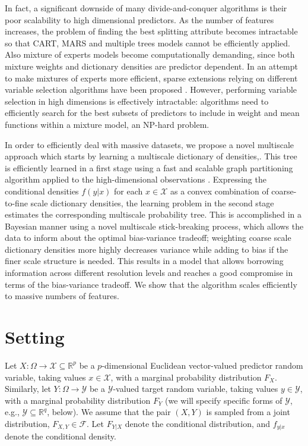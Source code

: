 \documentclass{article} %
\newcommand{\Real}{\mathbb{R}}
\providecommand{\mc}[1]{\mathcal{#1}}
\newcommand{\from}{{\ensuremath{\colon}}}  %
\begin{document}
In fact, a significant downside of many divide-and-conquer algorithms is their poor scalability to high dimensional predictors. As the number of features increases, the problem of finding the best splitting attribute becomes intractable so that CART, MARS and multiple trees models cannot be efficiently applied. Also mixture of experts models become computationally demanding, since both mixture weights and dictionary densities are predictor dependent. In an attempt to make mixtures of experts more efficient, sparse extensions relying on different variable selection algorithms have been proposed \cite{SparseMoF}. However, performing variable selection in high dimensions is effectively intractable: algorithms need to efficiently search for the best subsets of predictors to include in weight and mean functions within a mixture model, an NP-hard problem.

 In order to efficiently deal with massive datasets, we propose a novel multiscale approach which starts by learning a multiscale dictionary of densities,. This tree is efficiently learned in a first stage using a fast and scalable graph partitioning algorithm applied to the high-dimensional observations \cite{metis}.  Expressing the conditional densities $f(y|x)$ for each $x \in \mathcal{X}$ as a convex combination of coarse-to-fine scale dictionary densities, the learning problem in the second stage estimates the corresponding multiscale probability tree.  This is accomplished in a Bayesian manner using a novel multiscale stick-breaking process, which allows the data to inform about the optimal bias-variance tradeoff; weighting coarse scale dictionary densities more highly decreases variance while adding to bias if the finer scale structure is needed.  This results in a model that allows borrowing information across different resolution levels and reaches a good compromise in terms of the bias-variance tradeoff. We show that the algorithm scales efficiently to massive numbers of features. 


\section{Setting} \label{sec:setting}
Let $X \from \Omega \to \mc{X} \subseteq \Real^p$ be a 
$p$-dimensional Euclidean vector-valued predictor random variable, taking values $x \in \mc{X}$, with a marginal probability distribution $F_X$.  
Similarly, let $Y \from \Omega \to \mc{Y}$ 
be a $\mc{Y}$-valued target random variable, taking values $y \in \mc{Y}$, with a marginal probability distribution $F_Y$ (we will specify specific forms of $\mc{Y}$, e.g., $\mc{Y} \subseteq \Real^q$, below).  We assume that the pair $(X,Y)$ is sampled from a joint distribution, $F_{X,Y} \in \mc{F}$. Let $F_{Y|X}$ denote the conditional distribution, and $f_{y|x}$ denote the conditional density.
\end{document}
